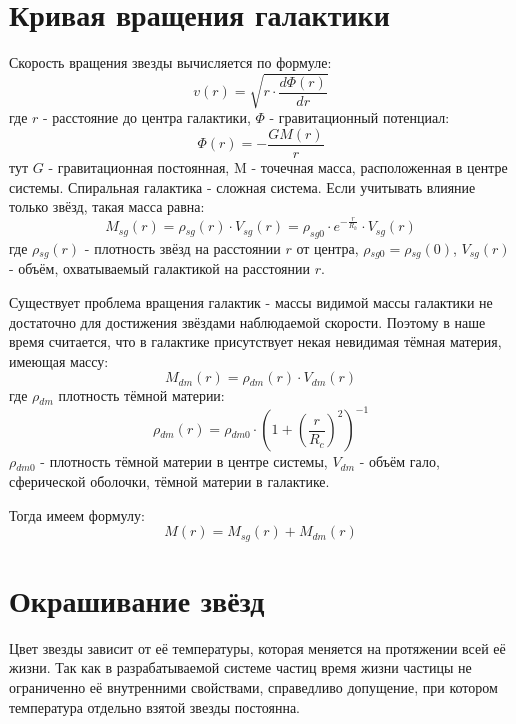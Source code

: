 \section{Кривая вращения галактики}
Скорость вращения звезды вычисляется по формуле:
\begin{equation}
	v(r) = \sqrt{r \cdot{} \frac{d\Phi{}(r)}{dr}}
\end{equation}
где $r$ - расстояние до центра галактики, $\Phi{}$ - гравитационный потенциал:
\begin{equation}
	\Phi{}(r) = -\frac{GM(r)}{r}
\end{equation}
тут $G$ - гравитационная постоянная, M - точечная масса, расположенная в центре системы. Спиральная галактика - сложная система. Если учитывать влияние только звёзд, такая масса равна:
\begin{equation}
	M_{sg}(r) = \rho{}_{sg}(r) \cdot{} V_{sg}(r) = \rho_{sg0} \cdot{} e^{-\frac{r}{R_h}} \cdot{} V_{sg}(r)
\end{equation}
где $\rho{}_{sg}(r)$ - плотность звёзд на расстоянии $r$ от центра, $\rho{}_{sg0} = \rho{}_{sg}(0)$, $V_{sg}(r)$ - объём, охватываемый галактикой на расстоянии $r$.

Существует проблема вращения галактик - массы видимой массы галактики не достаточно для достижения звёздами наблюдаемой скорости. Поэтому в наше время считается, что в галактике присутствует некая невидимая тёмная материя, имеющая массу:
\begin{equation}
	M_{dm}(r) = \rho{}_{dm}(r) \cdot{} V_{dm}(r)
\end{equation}
где $\rho{}_{dm}$ плотность тёмной материи:
\begin{equation}
	\rho{}_{dm}(r) = \rho{}_{dm0} \cdot{} (1 + (\frac{r}{R_c})^2)^{-1}
\end{equation}
$\rho{}_{dm0}$ - плотность тёмной материи в центре системы, $V_{dm}$ - объём гало, сферической оболочки, тёмной материи в галактике.

Тогда имеем формулу:
\begin{equation}
	M(r) = M_{sg}(r) + M_{dm}(r)
\end{equation}

\section{Окрашивание звёзд}
Цвет звезды зависит от её температуры, которая меняется на протяжении всей её жизни. Так как в разрабатываемой системе частиц время жизни частицы не ограниченно её внутренними свойствами, справедливо допущение, при котором температура отдельно взятой звезды постоянна.

